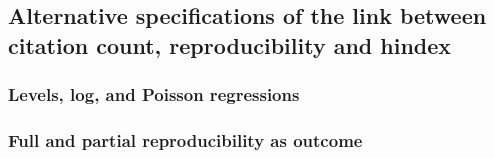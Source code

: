 \subsection{Alternative specifications of the link between citation count, reproducibility and hindex}

\subsubsection{Levels, log, and Poisson regressions}

\FloatBarrier

\FloatBarrier


\FloatBarrier


\subsubsection{Full and partial reproducibility as outcome}



\FloatBarrier

\FloatBarrier

\FloatBarrier


\FloatBarrier


\FloatBarrier